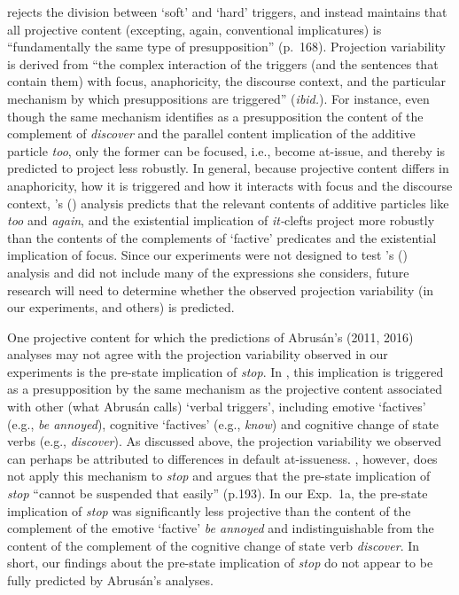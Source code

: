 \documentclass[11pt,fleqn]{article}
\newcommand{\6}{\mbox{$[\hspace*{-.6mm}[$}}
\newcommand{\9}{\mbox{$]\hspace*{-.6mm}]$}}
\newcommand{\citetpos}[1]{\citeauthor{#1}'s (\citeyear{#1})}
\begin{document}
\citet{abrusan2016} rejects the division between `soft' and `hard' triggers, and instead maintains that all projective content (excepting, again, conventional implicatures) is ``fundamentally the same type of presupposition'' (p.\ 168). Projection variability is derived from ``the complex interaction of the triggers (and the sentences that contain them) with focus, anaphoricity, the discourse context, and the particular mechanism by which presuppositions are triggered'' ({\em ibid.}). For instance, even though the same mechanism identifies as a presupposition the content of the complement of {\em discover} and the parallel content implication of the additive particle {\em too}, only the former can be focused, i.e., become at-issue, and thereby is predicted to project less robustly. In general, because projective content differs in anaphoricity, how it is triggered and how it interacts with focus and the discourse context, \citetpos{abrusan2016} analysis predicts that the relevant contents of additive particles like {\em too} and {\em again}, and the existential implication of {\em it-}clefts project more robustly than the contents of the complements of `factive' predicates and the existential implication of focus. Since our experiments were not designed to test \citetpos{abrusan2016} analysis and did not include many of the expressions she considers, future research will need to determine whether the observed projection variability (in our experiments, and others) is predicted.

One projective content for which the predictions of Abrus\'an's (2011, 2016) analyses may not agree with the projection variability observed in our experiments is the pre-state implication of {\em stop}. In \citealt{abrusan2011}, this implication is triggered as a presupposition by the same mechanism as the projective content associated with other (what Abrus\'an calls) `verbal triggers', including emotive `factives' (e.g., {\em be annoyed}), cognitive `factives' (e.g., {\em know}) and cognitive change of state verbs (e.g., {\em discover}). As discussed above, the projection variability we observed can perhaps be attributed to differences in default at-issueness.  \citet{abrusan2016}, however, does not apply this mechanism to {\em stop} and   argues that the pre-state implication of {\em stop} ``cannot be suspended that easily'' (p.193). In our Exp.~1a, the pre-state implication of {\em stop} was significantly less projective than the content of the complement of the emotive `factive' {\em be annoyed} and indistinguishable from the content of the complement of the cognitive change of state verb {\em discover}. In short, our findings about the pre-state implication of {\em stop} do not appear to be fully predicted by Abrus\'an's analyses. 
\end{document}
